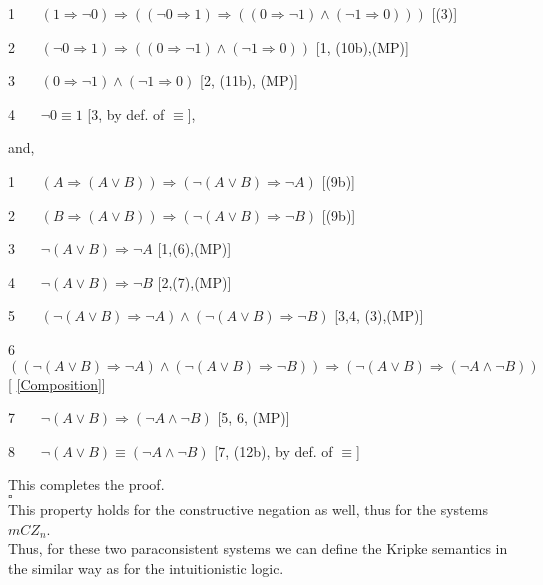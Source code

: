 \documentclass{llncs}
\begin{document}
1 \ \ \ $(1 \Rightarrow \neg 0) \Rightarrow ((\neg 0 \Rightarrow 1)
\Rightarrow ((0 \Rightarrow \neg 1) \wedge (\neg 1 \Rightarrow 0)))$
\hfill[(3)]

2 \ \ \ $(\neg 0 \Rightarrow 1) \Rightarrow ((0 \Rightarrow \neg 1)
\wedge (\neg 1 \Rightarrow 0))$ \hfill[1, (10b),(MP)]

3 \ \ \ $(0 \Rightarrow \neg 1) \wedge (\neg 1 \Rightarrow 0)$
\hfill[2, (11b), (MP)]

4 \ \ \ $\neg 0 \equiv
 1$ \hfill[3, by def. of $\equiv$],

 and,

 1 \ \ \ $(A\Rightarrow (A\vee  B)) \Rightarrow ( \neg(A \vee B) \Rightarrow \neg A)$
\hfill[(9b)]

2 \ \ \ $(B\Rightarrow (A\vee  B)) \Rightarrow ( \neg(A \vee B)
\Rightarrow \neg B)$ \hfill[(9b)]

3 \ \ \ $\neg(A \vee B) \Rightarrow \neg A$ \hfill[1,(6),(MP)]

4 \ \ \ $\neg(A \vee B) \Rightarrow \neg B$ \hfill[2,(7),(MP)]

5 \ \ \ $(\neg(A \vee B) \Rightarrow \neg A)\wedge (\neg(A \vee B)
\Rightarrow \neg B)$ \hfill[3,4, (3),(MP)]

6 \ \ \ $((\neg(A \vee B) \Rightarrow \neg A)\wedge (\neg(A \vee B)
\Rightarrow \neg B)) \Rightarrow (\neg(A \vee B) \Rightarrow (\neg A
\wedge \neg B))$ \hfill[ \eqref{Composition}]

7 \ \ \ $\neg(A \vee B) \Rightarrow (\neg A \wedge \neg B)$
\hfill[5, 6, (MP)]

8 \ \ \ $\neg(A \vee B) \equiv (\neg A \wedge \neg B)$ \hfill[7,
(12b), by def. of $\equiv$]

This completes the proof.
\\$\square$\\
This property holds for the constructive negation as well, thus for
the systems $mCZ_n$.\\
Thus, for these two paraconsistent systems we can define the Kripke
semantics in the similar way as for the intuitionistic logic.
\end{document}
